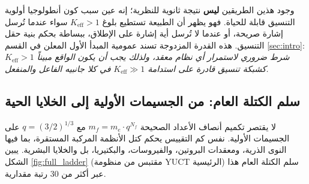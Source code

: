 \documentclass[12pt,a4paper]{article}
\begin{document}
	وجود هذين الطريقين \textbf{ليس} نتيجة ثانوية للنظرية؛ إنه عين سبب كون أنطولوجيا أولوية التنسيق قابلة للحياة. فهو يظهر أن الطبيعة تستطيع بلوغ \(K_{\mathrm{eff}} > 1\) سواء عندما تُرسل إشارة صريحة، أو عندما لا تُرسل أية إشارة على الإطلاق، ببساطة بحكم بنية حقل التنسيق. هذه القدرة المزدوجة تسند عمومية المبدأ الأول المعلن في القسم \ref{sec:intro}: \emph{\(K_{\mathrm{eff}} > 1\) شرط ضروري لاستمرار أي نظام معقد، ولذلك يجب أن يكون الواقع مبيناً كشبكة تنسيق قادرة على استدامة \(K_{\mathrm{eff}} \gg 1\) في كلا جانبيه الفاعل والمنفعل.}
	
	\subsection{سلم الكتلة العام: من الجسيمات الأولية إلى الخلايا الحية}
	\label{subsec:universal-ladder}
	
	لا يقتصر تكميم أنصاف الأعداد الصحيحة \(m_f = m_e \cdot q^{N_f}\) مع \(q = (3/2)^{1/3}\) على الجسيمات الأولية. نفس كم التقييس يحكم كتل الأنظمة المركبة المستقرة، بما فيها النوى الذرية، ومعقدات البروتين، والفيروسات، والبكتيريا، بل والخلايا البشرية. يبين الشكل \ref{fig:full_ladder} (مقتبس من منظومة YUCT الرئيسية) سلم الكتلة العام هذا عبر أكثر من 30 رتبة مقدارية.
	
\end{document}
